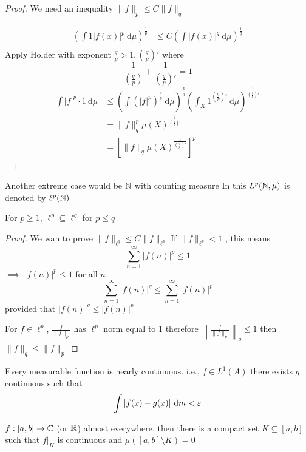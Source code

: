 \begin{proof}
  We need an inequality $\|f\|_p \le C \|f\|_q$

  \begin{align*}
    \left(\int 1 |f(x)|^p \ \mathrm{d}\mu\right)^{\frac1p} &\le C\left(\int |f(x)|^q \ \mathrm{d}\mu\right)^{\frac1q} \\
  \end{align*}
  Apply Holder with exponent $\frac{q}{p} > 1, \left(\frac{q}{p}\right)'$ where
  \[\frac1{\left(\frac qp\right)} + \frac1{\left(\frac qp\right)'} = 1\]
  \begin{align*}
    \int |f|^p \cdot 1\ \mathrm{d}\mu &\le \left(\int (|f|^p)^\frac{q}{p} \ \mathrm{d}\mu\right)^{\frac{p}{q}}\left(\int_X 1^{\left(\frac qp\right)'} \ \mathrm{d}\mu\right)^{\frac1{\left(\frac{q}p\right)'}} \\
    &= \|f\|_q^p\mu(X)^{\frac1{\left(\frac{q}p\right)'}} \\
    &= \left[\|f\|_q \mu(X)^{\frac1{\left(\frac{q}p\right)'}}\right]^p
  \end{align*}
\end{proof}

Another extreme case would be $\mathbb N$ with counting measure 
In this $L^p(\mathbb N, \mu)$ is denoted by $\ell^p(\mathbb N)$

\begin{theorem}
  For $p \ge 1$, $\ell^p \subseteq \ell^q$ for $p \le q$
\end{theorem}

\begin{proof}
  We wan to prove $\|f\|_{\ell^q} \le C\|f\|_{\ell^p}$
  If $\|f\|_{\ell^p} < 1$ , this means 
  \[\sum_{n=1}^\infty |f(n)|^p \le 1\]
  $\implies$ $|f(n)|^p \le 1$ for all $n$
  \[\sum_{n=1}^\infty |f(n)|^q \le \sum_{n=1}^\infty |f(n)|^p\]
  provided that $|f(n)|^q \le |f(n)|^p$

  For $f \in \ell^p$, $\frac{f}{\|f\|_p}$ has $\ell^p$ norm equal to 1
  therefore $\left\|\frac f{\|f\|_p}\right\|_q \le 1$ then $\|f\|_q \le \|f\|_p$
\end{proof}

\begin{theorem}
  Every measurable function is nearly continuous. i.e.,
  $f \in L^1(A)$ there exists $g$ continuous such that
  \[\int |f(x) - g(x)| \ \mathrm{d}m < \eps\]
\end{theorem}

\begin{theorem}
  $f:[a, b] \to \mathbb C$ (or $\mathbb R$) almost everywhere, 
  then there is a compact set $K \subseteq [a, b]$ such that $f|_K$ is continuous and $\mu([a, b] \setminus K) = 0$
\end{theorem}

